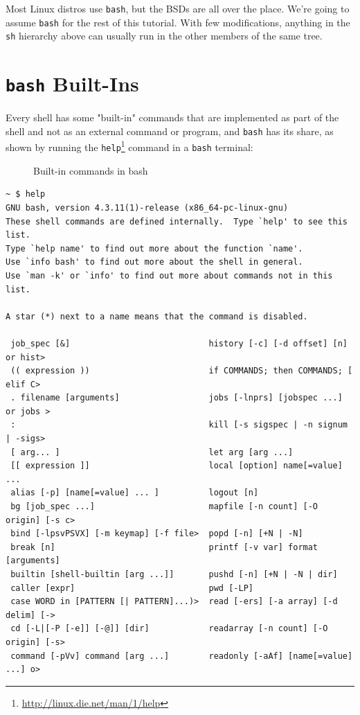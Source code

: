 \documentclass[10pt,]{book}
\renewcommand{\href}[2]{#2\footnote{\url{#1}}}
\numberwithin{figure}{chapter}
\DeclareRobustCommand{\drcap}[1]{\begin{figure}[H]\caption{#1}\end{figure}}
\DeclareRobustCommand{\drcmd}[1]{\index{Commands!#1}}
\DeclareRobustCommand{\drshl}[1]{\index{Shells!#1}}
\begin{document}
Most Linux distros use \texttt{bash}, but the BSDs are all over the
place. We're going to assume \texttt{bash} for the rest of this
tutorial. With few modifications, anything in the \texttt{sh} hierarchy
above can usually run in the other members of the same tree.

\section*{\texttt{bash} Built-Ins}\label{bash-built-ins}

Every shell has some "built-in" commands that are implemented as part of
the shell and not as an external command or program, and
\texttt{bash}\drshl{bash} has its share, as shown by running the
\href{http://linux.die.net/man/1/help}{\texttt{help}}\drcmd{help}
command in a \texttt{bash} terminal:

\drcap{Built-in commands in bash}

\begin{verbatim}
~ $ help
GNU bash, version 4.3.11(1)-release (x86_64-pc-linux-gnu)
These shell commands are defined internally.  Type `help' to see this list.
Type `help name' to find out more about the function `name'.
Use `info bash' to find out more about the shell in general.
Use `man -k' or `info' to find out more about commands not in this list.

A star (*) next to a name means that the command is disabled.

 job_spec [&]                            history [-c] [-d offset] [n] or hist>
 (( expression ))                        if COMMANDS; then COMMANDS; [ elif C>
 . filename [arguments]                  jobs [-lnprs] [jobspec ...] or jobs >
 :                                       kill [-s sigspec | -n signum | -sigs>
 [ arg... ]                              let arg [arg ...]
 [[ expression ]]                        local [option] name[=value] ...
 alias [-p] [name[=value] ... ]          logout [n]
 bg [job_spec ...]                       mapfile [-n count] [-O origin] [-s c>
 bind [-lpsvPSVX] [-m keymap] [-f file>  popd [-n] [+N | -N]
 break [n]                               printf [-v var] format [arguments]
 builtin [shell-builtin [arg ...]]       pushd [-n] [+N | -N | dir]
 caller [expr]                           pwd [-LP]
 case WORD in [PATTERN [| PATTERN]...)>  read [-ers] [-a array] [-d delim] [->
 cd [-L|[-P [-e]] [-@]] [dir]            readarray [-n count] [-O origin] [-s>
 command [-pVv] command [arg ...]        readonly [-aAf] [name[=value] ...] o>
\end{verbatim}
\end{document}
